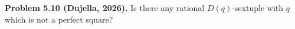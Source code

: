 \textbf{Problem 5.10 (Dujella, 2026).} Is there any rational $D(q)$-sextuple with $q$ which is not a perfect square?
